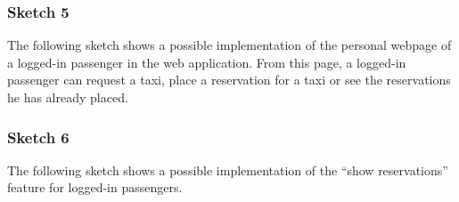 \subsubsection*{Sketch 5}
The following sketch shows a possible implementation of the personal webpage of a logged-in passenger in the web application. From this page, a logged-in passenger can request a taxi, place a reservation for a taxi or see the reservations he has already placed.
\begin{figure}[H]
\centering
{}
\end{figure}


\subsubsection*{Sketch 6}
The following sketch shows a possible implementation of the ``show reservations'' feature for logged-in passengers.
\begin{figure}[H]
\centering
{}
\end{figure}


